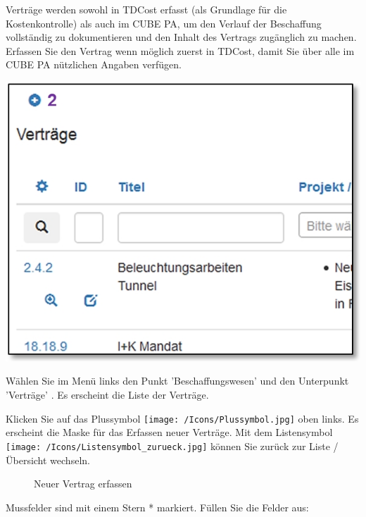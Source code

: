 Verträge werden sowohl in TDCost erfasst (als Grundlage für die Kostenkontrolle) als auch im CUBE PA, um den Verlauf der Beschaffung vollständig zu dokumentieren und den Inhalt des Vertrags zugänglich zu machen. Erfassen Sie den Vertrag wenn möglich zuerst in TDCost, damit Sie über alle im CUBE
PA nützlichen Angaben verfügen.

\begin{center}
\hspace{-55mm}   
\includegraphics[width=.4\linewidth]{../chapters/07_Beschaffungswesen/pictures/7-1-8_NeuerVertrag.jpg}
\end{center}

\vspace{\baselineskip}

Wählen Sie im Menü links den Punkt 'Beschaffungswesen' und den Unterpunkt 'Verträge' . Es erscheint die Liste der Verträge.

\vspace{\baselineskip}

Klicken Sie auf das Plussymbol \texttt{[image: /Icons/Plussymbol.jpg]}  oben links. Es erscheint die Maske für das Erfassen neuer Verträge. Mit dem Listensymbol \texttt{[image: /Icons/Listensymbol\_zurueck.jpg]}  können Sie zurück zur Liste / Übersicht wechseln.

\begin{figure}[H]
\caption{Neuer Vertrag erfassen}
\end{figure}

Mussfelder sind mit einem Stern * markiert. Füllen Sie die Felder aus:

\vspace{\baselineskip}

